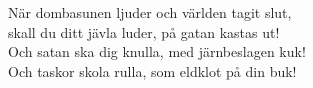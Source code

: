 \vspace{10pt}
När dombasunen ljuder och världen tagit slut,\\
skall du ditt jävla luder, på gatan kastas ut!\\
Och satan ska dig knulla, med järnbeslagen kuk!\\
Och taskor skola rulla, som eldklot på din buk!
